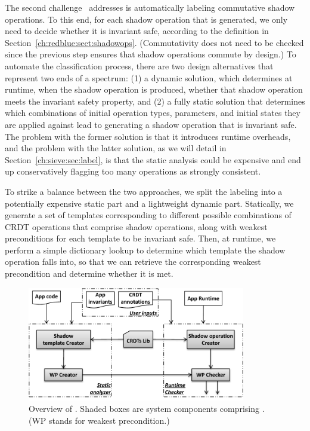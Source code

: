 The second challenge \tool\ addresses is automatically
labeling commutative shadow operations. To this end, for each shadow operation that is
generated, we only need to decide whether it is invariant safe, according to the
definition in Section~\ref{ch:redblue:sect:shadowops}. (Commutativity does not need
to be checked since the previous step ensures that shadow operations
commute by design.) To automate the classification
process, there are two design alternatives that
represent two ends of a spectrum: (1) a dynamic solution, which determines
at runtime, when the shadow operation is produced, whether that
shadow operation meets the invariant safety property, and (2) a
fully static solution that determines which combinations of initial operation
types, parameters, and initial states they are applied against lead to
generating a shadow operation that is invariant safe.
The problem with the former solution is that it
introduces runtime overheads, and the problem with the latter solution, as
we will detail in Section~\ref{ch:sieve:sec:label}, is
that the static analysis could be expensive and end up conservatively
flagging too many operations as strongly consistent.

To strike a balance between the two approaches, we split the labeling
into a potentially expensive static part and a lightweight dynamic part.
Statically, we generate a set of templates corresponding to different
possible combinations of CRDT operations that comprise shadow operations,
along with weakest preconditions for each template to be invariant
safe. Then, at runtime, we perform a simple dictionary lookup
to determine which
template the shadow operation falls into, so that we can retrieve
the corresponding weakest precondition and determine whether it is met.

\begin{figure}[t!]
  \centering
  \includegraphics[width=0.85\textwidth]{./figures/sieve/sievearchitecture.pdf}
  \caption{Overview of \tool. Shaded boxes are system components comprising \tool. (WP stands for weakest precondition.)}
  \label{fig:overview}
\end{figure}

